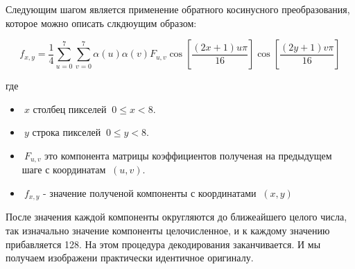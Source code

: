 \documentclass{matmex-diploma-custom}
\begin{document}
Следующим шагом является применение обратного косинусного преобразования, которое можно описать слкдюущим образом:


$$f_{x,y} =
 \frac{1}{4}
 \sum_{u=0}^7
 \sum_{v=0}^7
 \alpha(u) \alpha(v) F_{u,v}
 \cos \left[\frac{(2x+1)u\pi}{16} \right]
 \cos \left[\frac{(2y+1)v\pi}{16} \right]

$$

где

\begin{itemize}
\item{
$\ x$ столбец пикселей $\ 0 \leq x < 8$.
}
\item{
$\ y$ строка пикселей $\ 0 \leq y < 8$.
}
\item{
$\ F_{u,v}$ это компонента матрицы коэффициентов полученая на предыдущем шаге с координатам $\ (u,v)$.
}
\item{
$\ f_{x,y}$ - значение полученой компоненты с координатами $\ (x,y)$
}
\end{itemize}

После значения  каждой компоненты округляются до ближеайшего целого числа, так изначально значение компоненты целочисленное, и к каждому значению прибавляется 128. На этом процедура декодирования заканчивается. И мы получаем изображени практически идентичное оригиналу.








\end{document}
